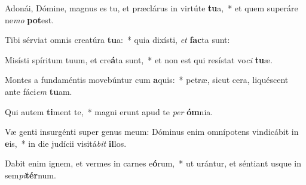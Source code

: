 \item Adonái, Dómine, magnus es tu, et præclárus in virtúte \textbf{tu}a,~* et quem superáre ne\textit{mo} \textbf{pot}est.
\item Tibi sérviat omnis creatúra \textbf{tu}a:~* quia dixísti, \textit{et} \textbf{fac}ta sunt:
\item Misísti spíritum tuum, et cre\textbf{á}ta sunt,~* et non est qui resístat vo\textit{ci} \textbf{tu}æ.
\item Montes a fundaméntis movebúntur cum \textbf{a}quis:~* petræ, sicut cera, liquéscent ante fáci\textit{em} \textbf{tu}am.
\item Qui autem \textbf{ti}ment te,~* magni erunt apud te \textit{per} \textbf{óm}nia.
\item Væ genti insurgénti super genus meum: Dóminus enim omnípotens vindicábit in \textbf{e}is,~* in die judícii visitá\textit{bit} \textbf{il}los.
\item Dabit enim ignem, et vermes in carnes e\textbf{ó}rum,~* ut urántur, et séntiant usque in sem\textit{pi}\textbf{tér}num.
